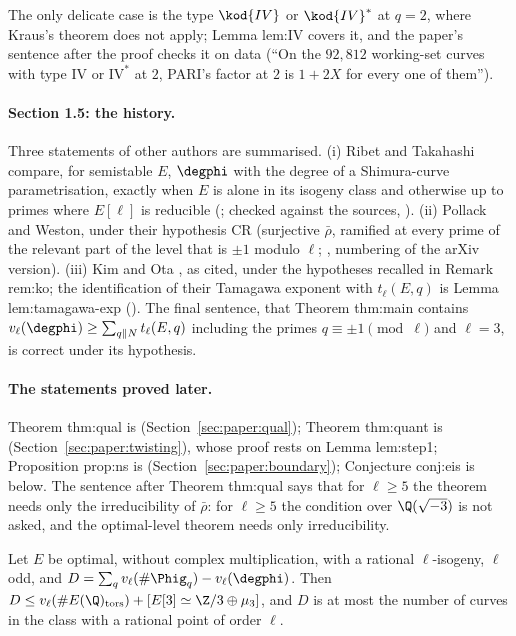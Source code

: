 \begin{sloppypar}
\noindent The only delicate case is the type $\kod{IV}$ or $\kod{IV}^*$ at $q=2$, where Kraus's theorem does not apply; Lemma lem:IV covers it, and the paper's sentence after the
proof checks it on data (``On the $92{,}812$ working-set curves with type $\mathrm{IV}$ or $\mathrm{IV}^*$ at $2$, PARI's factor at $2$ is $1+2X$ for every one of them'').

\paragraph{Section 1.5: the history.} Three statements of other authors are summarised. (i) Ribet and Takahashi compare, for semistable $E$, $\degphi$ with the
degree of a Shimura-curve parametrisation, exactly when $E$ is alone in its isogeny class and otherwise up to primes where $E[\ell]$ is reducible
(\cite{RibetTakahashi97,Takahashi01}; checked against the sources, ). (ii) Pollack and Weston, under their hypothesis CR (surjective $\bar\rho$,
ramified at every prime of the relevant part of the level that is $\pm1$ modulo $\ell$; \cite[Section 1 and Theorem 6.11]{PollackWeston11}, numbering of the arXiv
version). (iii) Kim and Ota \cite[Theorem 1.3]{KimOta}, as cited, under the hypotheses recalled in Remark rem:ko; the identification of their Tamagawa exponent with $t_\ell(E,q)$ is Lemma lem:tamagawa-exp (). The
final sentence, that Theorem thm:main contains $v_\ell(\degphi)\ge\sum_{q\|N}t_\ell(E,q)$ including the primes $q\equiv\pm1\pmod\ell$ and $\ell=3$, is correct under its
hypothesis.

\paragraph{The statements proved later.} Theorem thm:qual is  (Section~\ref{sec:paper:qual}); Theorem thm:quant is
 (Section~\ref{sec:paper:twisting}), whose proof rests on Lemma lem:step1; Proposition prop:ns is 
(Section~\ref{sec:paper:boundary}); Conjecture conj:eis is  below. The sentence after Theorem thm:qual says that for $\ell\ge5$
the theorem needs only the irreducibility of $\bar\rho$: for $\ell\ge5$ the condition over $\Q(\sqrt{-3})$ is not asked, and the optimal-level
theorem needs only irreducibility.

\begin{conjecture}\label{conj:paper:eis}
Let $E$ be optimal, without complex multiplication, with a rational $\ell$-isogeny, $\ell$ odd, and $D=\sum_qv_\ell(\#\Phig_q)-v_\ell(\degphi)$. Then
$D\le v_\ell(\#E(\Q)_{\mathrm{tors}})+[E[3]\simeq\Z/3\oplus\mu_3]$, and $D$ is at most the number of curves in the class with a rational point of order $\ell$.
\end{conjecture}


\end{sloppypar}
